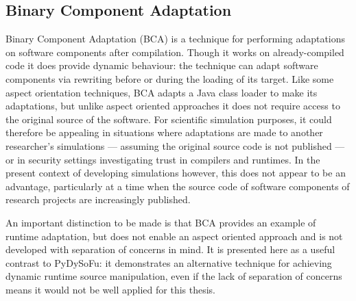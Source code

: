 \subsection{Binary Component Adaptation}\label{subsec:BCA} Binary Component
Adaptation\cite{keller1998binary} (BCA) is a technique for performing
adaptations on software components after compilation. Though it works on
already-compiled code it does provide dynamic behaviour: the technique can adapt
software components via rewriting before or during the loading of its target.
Like some aspect orientation techniques, BCA adapts a Java class
loader to make its adaptations, but unlike aspect oriented approaches it does
not require access to the original source of the software. For scientific
simulation purposes, it could therefore be appealing in situations where
adaptations are made to another researcher's simulations --- assuming the
original source code is not published --- or in security settings investigating
trust in compilers and runtimes\cite{trustingtrust}. In the present context of
developing \sociotechnical simulations however, this does not appear to be an
advantage, particularly at a time when the source code of software components of
research projects are increasingly published.

An important distinction to be made is that BCA provides an example of runtime
adaptation, but does not enable an aspect oriented approach and is not developed
with separation of concerns in mind. It is presented here as a useful contrast
to PyDySoFu: it demonstrates an alternative technique for achieving dynamic
runtime source manipulation, even if the lack of separation of concerns means it
would not be well applied for this thesis.






